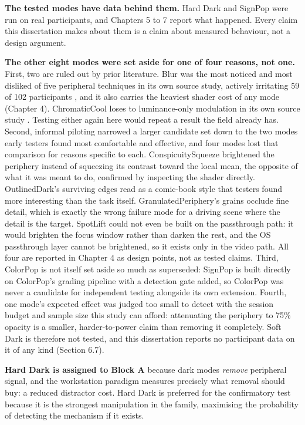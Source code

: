 \textbf{The tested modes have data behind them.} Hard Dark and SignPop were run on real participants,
and Chapters 5 to 7 report what happened. Every claim this dissertation makes about them is a claim
about measured behaviour, not a design argument.

\textbf{The other eight modes were set aside for one of four reasons, not one.} First, two are ruled
out by prior literature. Blur was the most noticed and most disliked of five peripheral techniques in
its own source study, actively irritating 59 of 102 participants \citep{grogorick2018}, and it also
carries the heaviest shader cost of any mode (Chapter 4). ChromaticCool loses to luminance-only
modulation in its own source study \citep{bailey2009}. Testing either again here would repeat a
result the field already has. Second, informal piloting narrowed a larger candidate set down to the
two modes early testers found most comfortable and effective, and four modes lost that comparison for
reasons specific to each. ConspicuitySqueeze brightened the periphery instead of squeezing its
contrast toward the local mean, the opposite of what it was meant to do, confirmed by inspecting the
shader directly. OutlinedDark's surviving edges read as a comic-book style that testers found more
interesting than the task itself. GranulatedPeriphery's grains occlude fine detail, which is exactly
the wrong failure mode for a driving scene where the detail is the target. SpotLift could not even be
built on the passthrough path: it would brighten the focus window rather than darken the rest, and the
OS passthrough layer cannot be brightened, so it exists only in the video path. All four are reported
in Chapter 4 as design points, not as tested claims. Third, ColorPop is
not itself set aside so much as superseded: SignPop is built directly
on ColorPop's grading pipeline with a detection gate added, so ColorPop was never a candidate for
independent testing alongside its own extension. Fourth, one mode's expected effect was judged too
small to detect with the session budget and sample size this study can afford: attenuating the
periphery to 75\% opacity is a smaller, harder-to-power claim than removing it completely. Soft Dark
is therefore not tested, and this dissertation reports no participant data on it of any kind
(Section 6.7).

\textbf{Hard Dark is assigned to Block A} because dark modes \textit{remove} peripheral signal, and the
workstation paradigm measures precisely what removal should buy: a reduced distractor cost. Hard Dark
is preferred for the confirmatory test because it is the strongest manipulation in the family,
maximising the probability of detecting the mechanism if it exists.

